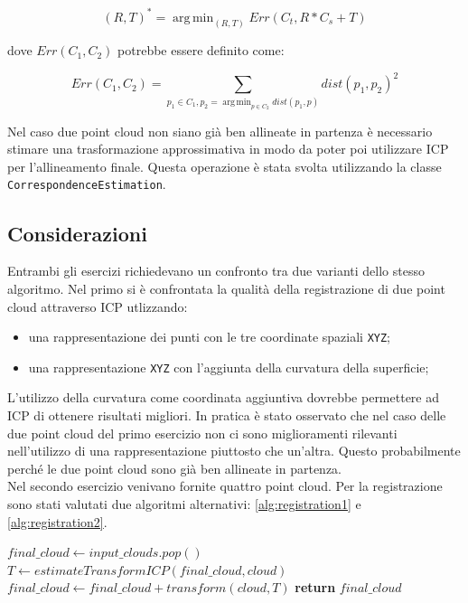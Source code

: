 \documentclass[a4paper]{article}
\DeclareMathOperator*{\argmin}{arg\,min}
\begin{document}
	\begin{equation}
	(R,T)^* = \argmin_{(R,T)}{Err(C_{t}, R*C_{s} + T)}
	\end{equation}
	
	dove $Err(C_1, C_2)$ potrebbe essere definito come:
	
	\begin{equation}
	Err(C_1, C_2) = \sum_{p_1 \in C_1, p_2 = \argmin_{p \in C_2}{dist(p_1, p)}}{dist(p_1,p_2)^2}
	\end{equation}
	
	Nel caso due point cloud non siano già ben allineate in partenza è necessario stimare una trasformazione approssimativa in modo da poter poi utilizzare ICP per l'allineamento finale.
	Questa operazione è stata svolta utilizzando la classe \verb|CorrespondenceEstimation|.

	\subsection{Considerazioni} \label{sec:lab3_disc}
	Entrambi gli esercizi richiedevano un confronto tra due varianti dello stesso algoritmo. Nel primo si è confrontata la qualità della registrazione di due point cloud attraverso ICP utlizzando:
	\begin{itemize}
		\item una rappresentazione dei punti con le tre coordinate spaziali \verb|XYZ|;
		\item una rappresentazione \verb|XYZ| con l'aggiunta della curvatura della superficie;
	\end{itemize} 
	L'utilizzo della curvatura come coordinata aggiuntiva dovrebbe permettere ad ICP di ottenere risultati migliori. In pratica è stato osservato che nel caso delle due point cloud del primo esercizio non ci sono miglioramenti rilevanti nell'utilizzo di una rappresentazione piuttosto che un'altra. Questo probabilmente perché le due point cloud sono già ben allineate in partenza. \\
	Nel secondo esercizio venivano fornite quattro point cloud. Per la registrazione sono stati valutati due algoritmi alternativi: \ref{alg:registration1} e \ref{alg:registration2}.
	
	\begin{algorithm}
		\label{alg:registration1}
		\caption{}
		\begin{algorithmic}
				\State $final\_cloud \gets input\_clouds.pop()$ 
					\State $T \gets estimateTransformICP(final\_cloud, cloud)$
					\State $final\_cloud \gets final\_cloud + transform(cloud,T)$
				\EndFor
				\State \textbf{return} $final\_cloud$
			\EndFunction
		\end{algorithmic}
	\end{algorithm}
\end{document}
